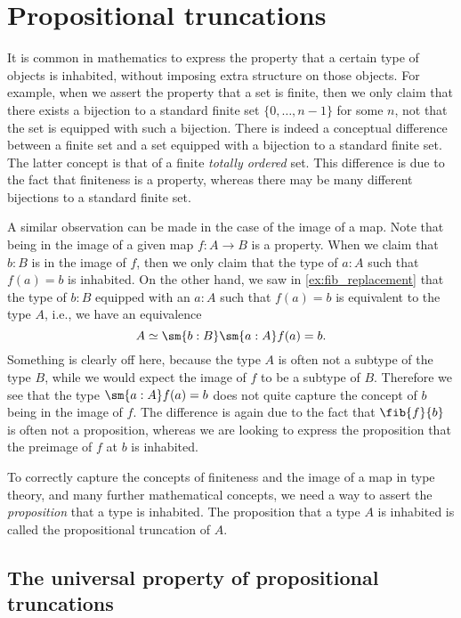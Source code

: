 \section{Propositional truncations}\label{sec:propositional-truncation}\label{chap:propositional-truncation}

It is common in mathematics to express the property that a certain type of objects is inhabited, without imposing extra structure on those objects. For example, when we assert the property that a set is finite, then we only claim that there exists a bijection to a standard finite set $\{0,\ldots,n-1\}$ for some $n$, not that the set is equipped with such a bijection. There is indeed a conceptual difference between a finite set and a set equipped with a bijection to a standard finite set. The latter concept is that of a finite \emph{totally ordered} set. This difference is due to the fact that finiteness is a property, whereas there may be many different bijections to a standard finite set.

A similar observation can be made in the case of the image of a map. Note that being in the image of a given map $f:A\to B$ is a property. When we claim that $b:B$ is in the image of $f$, then we only claim that the type of $a:A$ such that $f(a)=b$ is inhabited. On the other hand, we saw in \cref{ex:fib_replacement} that the type of $b:B$ equipped with an $a:A$ such that $f(a)=b$ is equivalent to the type $A$, i.e., we have an equivalence
\begin{equation*}
  A\simeq \sm{b:B}\sm{a:A}f(a)=b.
\end{equation*}
Something is clearly off here, because the type $A$ is often not a subtype of the type $B$, while we would expect the image of $f$ to be a subtype of $B$. Therefore we see that the type $\sm{a:A}f(a)=b$ does not quite capture the concept of $b$ being in the image of $f$. The difference is again due to the fact that $\fib{f}{b}$ is often not a proposition, whereas we are looking to express the proposition that the preimage of $f$ at $b$ is inhabited.

To correctly capture the concepts of finiteness and the image of a map in type theory, and many further mathematical concepts, we need a way to assert the \emph{proposition} that a type is inhabited. The proposition that a type $A$ is inhabited is called the propositional truncation of $A$.

\subsection{The universal property of propositional truncations}\label{sec:propositional-truncation-up}

